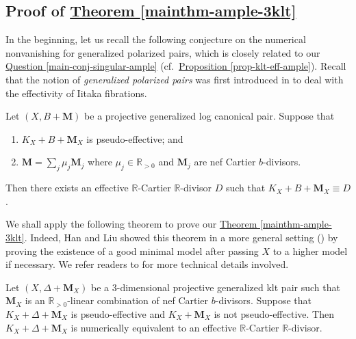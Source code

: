 \subsection{Proof of \texorpdfstring{{\hyperref[mainthm-ample-3klt]{Theorem \ref*{mainthm-ample-3klt}}}}{text}}
In the beginning, let us recall
the following conjecture on the numerical nonvanishing for generalized polarized pairs, which is closely related to our {\hyperref[main-conj-singular-ample]{Question \ref*{main-conj-singular-ample}}} (cf.~{\hyperref[prop-klt-eff-ample]{Proposition \ref*{prop-klt-eff-ample}}}). 
Recall that the notion of \textit{generalized polarized pairs} was first introduced in \cite{BZ16} to deal with the effectivity of Iitaka fibrations.  %
\begin{conj}[{\cite[Conjecture 1.2]{HL20}}]
Let $(X,B+\mathbf{M})$ be a projective generalized log canonical pair.
Suppose that 
\begin{enumerate}
\item[(i)] $K_X+B+\mathbf{M}_X$ is pseudo-effective; and
\item[(ii)]	$\mathbf{M}=\sum_j\mu_j\mathbf{M}_j$ where $\mu_j\in\mathbb{R}_{>0}$ and $\mathbf{M}_j$ are nef Cartier $b$-divisors.
\end{enumerate}
Then there exists an effective $\mathbb{R}$-Cartier $\mathbb{R}$-divisor $D$ such that $K_X+B+\mathbf{M}_X\equiv D$.
\end{conj}





We shall apply the following theorem to prove our \hyperref[mainthm-ample-3klt]{Theorem \ref*{mainthm-ample-3klt}}. 
Indeed, Han and Liu showed this theorem in a more general setting (\cite[Theorem 4.5]{HL20}) by proving the existence of a good minimal model   after  passing $X$ to a higher model if necessary. 
We refer readers to  \cite[Section 4]{HL20} for more technical details involved. 
\begin{thm}\label{thm-hl20-numeff}
Let $(X,\Delta+\mathbf{M}_X)$ be a $3$-dimensional projective generalized klt pair such that $\mathbf{M}_X$ is an $\mathbb{R}_{>0}$-linear combination of nef Cartier $b$-divisors.
Suppose that $K_X+\Delta+\mathbf{M}_X$ is pseudo-effective and $K_X+\mathbf{M}_X$ is not pseudo-effective.
Then $K_X+\Delta+\mathbf{M}_X$ is numerically equivalent to an effective $\mathbb{R}$-Cartier $\mathbb{R}$-divisor.
\end{thm}


